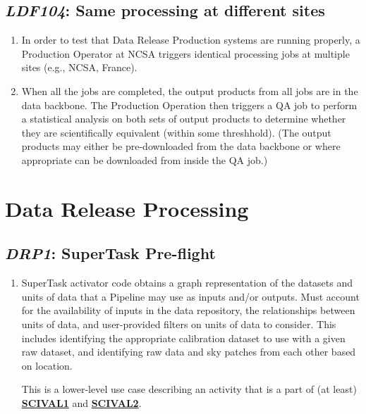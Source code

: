 \documentclass[DM,toc,lsstdraft]{lsstdoc}
\newcommand{\usecase}[3]{%
\subsection{\emph{#1}: #2}
\label{use:#1}
\begin{enumerate}[label=\alph*.]
#3
\end{enumerate}
}
\newcommand{\useref}[1]{\hyperref[use:#1]{\textcolor{lsstblue}{\textbf{#1}}}}
\begin{document}
\usecase{LDF104}{Same processing at different sites}{%

\item
In order to test that Data Release Production systems are running properly, a Production Operator at NCSA triggers identical processing jobs at multiple sites (e.g., NCSA, France).

\item
When all the jobs are completed, the output products from all jobs are in the data backbone.
The Production Operation then triggers a QA job to perform a statistical analysis on both sets of output products to determine whether they are scientifically equivalent (within some threshhold).
(The output products may either be pre-downloaded from the data backbone or where appropriate can be downloaded from inside the QA job.)

}

\section{Data Release Processing}

\usecase{DRP1}{SuperTask Pre-flight}{%

\item
SuperTask activator code obtains a graph representation of the datasets and units of data that a Pipeline may use as inputs and/or outputs.
Must account for the availability of inputs in the data repository, the relationships between units of data, and user-provided filters on units of data to consider.
This includes identifying the appropriate calibration dataset to use with a given raw dataset, and identifying raw data and sky patches from each other based on location.

This is a lower-level use case describing an activity that is a part of (at least) \useref{SCIVAL1} and \useref{SCIVAL2}.

}
\end{document}
